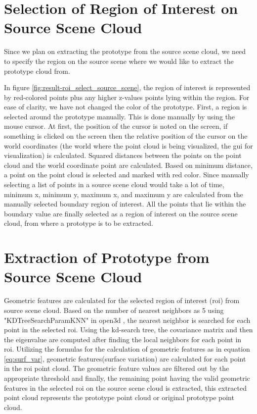 \section{Selection of Region of Interest on Source Scene Cloud}
Since we plan on extracting the prototype from the source scene cloud, we need to specify the region on the source scene where we would like to extract the prototype cloud from.

In figure \ref{fig:result-roi_select_source_scene}, the region of interest is represented by red-colored points plus any higher z-values points lying within the region. For ease of clarity, we have not changed the color of the prototype. First, a region is selected around the prototype manually. This is done manually by using the mouse cursor. At first, the position of the cursor is noted on the screen, if something is clicked on the screen then the relative position of the cursor on the world coordinates (the world where the point cloud is being visualized, the \acrshort{gui} for visualization) is calculated. Squared distances between the points on the point cloud and the world coordinate point are calculated. Based on minimum distance, a point on the point cloud is selected and marked with red color. Since manually selecting a list of points in a source scene cloud would take a lot of time, minimum x, minimum y, maximum x, and maximum y are calculated from the manually selected boundary region of interest. All the points that lie within the boundary value are finally selected as a region of interest on the source scene cloud, from where a prototype is to be extracted.

\section{Extraction of Prototype from Source Scene Cloud}
Geometric features are calculated for the selected region of interest (\acrshort{roi}) from source scene cloud. Based on the number of nearest neighbors as 5 using "KDTreeSearchParamKNN" in open3d \parencite{open3d}, the nearest neighbor is searched for each point in the selected \acrshort{roi}. Using the kd-search tree, the covariance matrix and then the eigenvalue are computed after finding the local neighbors for each point in \acrshort{roi}. Utilizing the formulas for the calculation of geometric features as in equation \ref{eq:surf_var}, geometric features(surface variation) are calculated for each point in the \acrshort{roi} point cloud. The geometric feature values are filtered out by the appropriate threshold and finally, the remaining point having the valid geometric features in the selected \acrshort{roi} on the source scene cloud is extracted, this extracted point cloud represents the prototype point cloud or original prototype point cloud.

